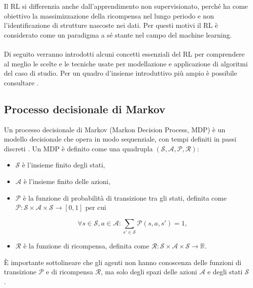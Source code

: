 Il RL si differenzia anche dall'apprendimento non supervisionato, perché ha come obiettivo la massimizzazione della ricompensa nel lungo periodo e non l'identificazione di strutture nascoste nei dati. Per questi motivi il RL è considerato come un paradigma a sé stante nel campo del machine learning.

\paragraph{} Di seguito verranno introdotti alcuni concetti essenziali del RL per comprendere al meglio le scelte e le tecniche usate per modellazione e applicazione di algoritmi del caso di studio. Per un quadro d'insieme introduttivo più ampio è possibile consultare \cite{Ghasemi2024}.

\subsection{Processo decisionale di Markov}
\label{sec:2_mdp}

Un processo decisionale di Markov (Markon Decision Process, MDP) è un modello decisionale che opera in modo sequenziale, con tempi definiti in passi discreti \cite{Puterman1994}. Un MDP è definito come una quadrupla $(\mathcal{S}, \mathcal{A}, \mathcal{P}, \mathcal{R})$:

\begin{itemize}
    \item $\mathcal{S}$ è l'insieme finito degli stati,

    \item $\mathcal{A}$ è l'insieme finito delle azioni,

    \item $\mathcal{P}$ è la funzione di probabilità di transizione tra gli stati, definita come ${\mathcal{P}: \mathcal{S} \times \mathcal{A} \times \mathcal{S} \to [0, 1]}$ per cui

    \begin{equation}
        \forall s \in \mathcal{S}, a \in \mathcal{A}: \sum_{s' \in \mathcal{S}} \mathcal{P}(s, a, s') = 1,
    \end{equation}

    \item $\mathcal{R}$ è la funzione di ricompensa, definita come $\mathcal{R}: \mathcal{S} \times \mathcal{A} \times \mathcal{S} \to \mathbb{R}$.
\end{itemize}

È importante sottolineare che gli agenti non hanno conoscenza delle funzioni di transizione $\mathcal{P}$ e di ricompensa $\mathcal{R}$, ma solo degli spazi delle azioni $\mathcal{A}$ e degli stati $\mathcal{S}$.

